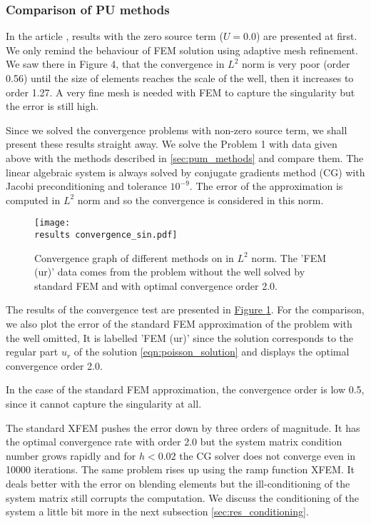 \documentclass[dvipsnames,FM,Dis]{tulthesis}
\newcommand{\fig}[1]{\hyperref[#1]{Figure \ref{#1}}}
\newcommand{\results}{results/}
\begin{document}
\subsubsection{Comparison of PU methods} \label{sec:res_comparison}

In the article \cite{exner_2016}, results with the zero source term ($U=0.0$) are presented at first. We only
remind the behaviour of FEM solution using adaptive mesh refinement.
We saw there in Figure 4, that the convergence in $L^2$ norm is very poor (order 0.56) until the size of elements 
reaches the scale of the well, then it increases to order 1.27. A very fine mesh is needed with FEM to capture 
the singularity but the error is still high.

Since we solved the convergence problems with non-zero source term, we shall present these results straight away.
We solve the Problem 1 with data given above with the methods described in \ref{sec:pum_methods} and compare them.
The linear algebraic system is always solved by conjugate gradients method (CG) with Jacobi preconditioning 
and tolerance $10^{-9}$. The error of the approximation is computed in $L^2$ norm and so the convergence is
considered in this norm.

\begin{figure}[!htb]
  \centering    
  \texttt{[image: \\results convergence\_sin.pdf]}
  \caption[Convergence graph]{Convergence graph of different methods on in $L^2$ norm. The 'FEM (ur)'
  data comes from the problem without the well solved by standard FEM and with optimal convergence order 2.0.}
  \label{fig:convergence_sin}
\end{figure}

The results of the convergence test are presented in \fig{fig:convergence_sin}.
For the comparison, we also plot the error of the standard FEM approximation of the problem with the well omitted, 
It is labelled 'FEM (ur)' since the solution corresponds to the regular part $u_r$ of the solution \eqref{eqn:poisson_solution}  
and displays the optimal convergence order 2.0.

In the case of the standard FEM approximation, the convergence order is low 0.5, since it cannot capture the 
singularity at all.

The standard XFEM pushes the error down by three orders of magnitude. It has the optimal convergence rate with order 2.0 but the system
matrix condition number grows rapidly and for $h<0.02$ the CG solver does not converge even in 10000 iterations. The same
problem rises up using the ramp function XFEM. It deals better with the error on blending elements but the
ill-conditioning of the system matrix still corrupts the computation. We discuss the conditioning of the system 
a little bit more in the next subsection \ref{sec:res_conditioning}.
\end{document}
